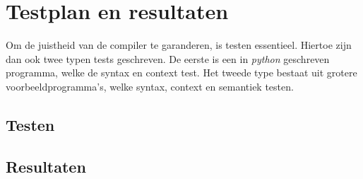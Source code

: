 \chapter{Testplan en resultaten} %
\label{cha:testplan_en_resultaten}
Om de juistheid van de compiler te garanderen, is testen essentieel. Hiertoe zijn dan ook twee typen tests geschreven. De eerste is een in \emph{python} geschreven programma, welke de syntax en context test. Het tweede type bestaat uit grotere voorbeeldprogramma's, welke syntax, context en semantiek testen.

\section{Testen} %
\label{sec:testen}


\section{Resultaten} %
\label{sec:resultaten}


\clearpage